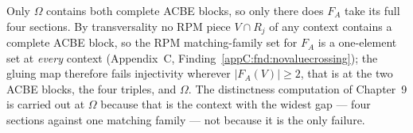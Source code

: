 \begin{remark}\label{appB:whyfour}
Only $\Omega$ contains both complete ACBE blocks, so only there does $F_A$ take
its full four sections. By transversality no RPM piece $V\cap R_j$ of any
context contains a complete ACBE block, so the RPM matching-family set for
$F_A$ is a one-element set at \emph{every} context (Appendix~C,
Finding~\ref{appC:fnd:novaluecrossing}); the gluing map therefore fails
injectivity wherever $|F_A(V)|\ge 2$, that is at the two ACBE blocks, the four
triples, and $\Omega$. The distinctness computation of Chapter~9 is carried out
at $\Omega$ because that is the context with the widest gap --- four sections
against one matching family --- not because it is the only failure.
\end{remark}
